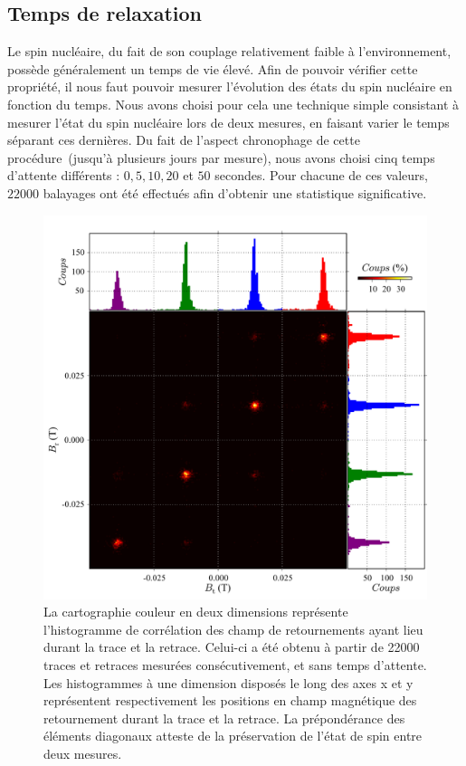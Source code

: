 \subsection{Temps de relaxation}
Le spin nucléaire, du fait de son couplage relativement faible à l’environnement, possède généralement un temps de vie élevé. Afin de pouvoir vérifier cette propriété, il nous faut pouvoir mesurer l'évolution des états du spin nucléaire en fonction du temps. Nous avons choisi pour cela une technique simple consistant à mesurer l'état du spin nucléaire lors de deux mesures, en faisant varier le temps séparant ces dernières. Du fait de l'aspect chronophage de cette procédure~(jusqu'à plusieurs jours par mesure), nous avons choisi cinq temps d'attente différents : $0,5,10,20$ et $50$ secondes. Pour chacune de ces valeurs, $22000$ balayages ont été effectués afin d'obtenir une statistique significative.


\begin{figure}
\includegraphics[scale=0.45]{Resultats/Hist2D/Hist2D.pdf} 
\caption{La cartographie couleur en deux dimensions représente l’histogramme de corrélation des champ de retournements ayant lieu durant la trace et la retrace. Celui-ci a été obtenu à partir de 22000 traces et retraces mesurées consécutivement, et sans temps d'attente. Les histogrammes à une dimension disposés le long des axes x et y représentent respectivement les positions en champ magnétique des retournement durant la trace et la retrace. La prépondérance des éléments diagonaux atteste de la préservation de l'état de spin entre deux mesures.}
\label{correlations}
\end{figure}

